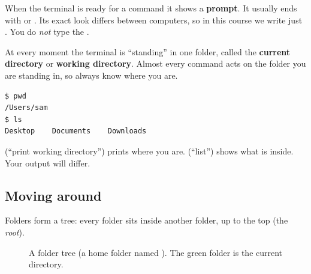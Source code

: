 When the terminal is ready for a command it shows a \textbf{prompt}. It usually ends with \code{\$} or \code{\%}. Its exact look differs between computers, so in this course we write just \code{\$}. You do \emph{not} type the \code{\$}.

At every moment the terminal is ``standing'' in one folder, called the \textbf{current directory} or \textbf{working directory}. Almost every command acts on the folder you are standing in, so always know where you are.

\begin{lstlisting}
$ pwd
/Users/sam
$ ls
Desktop    Documents    Downloads
\end{lstlisting}

 (``print working directory'') prints where you are.  (``list'') shows what is inside. Your output will differ.

\subsection{Moving around}

Folders form a tree: every folder sits inside another folder, up to the top (the \emph{root}).

\begin{figure}[H]
\centering
{}
\caption{A folder tree (a home folder named ). The green folder is the current directory.}
\label{fig:tree}
\end{figure}

